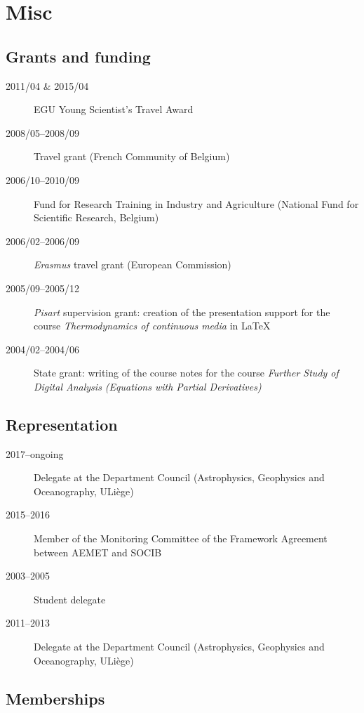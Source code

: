 \documentclass[11pt,a4paper,svgnames]{article}
\begin{document}
\section{Misc}

\subsection{Grants and funding}

\begin{description}
\item[2011/04 \& 2015/04] EGU Young Scientist's Travel Award
\item[2008/05--2008/09] Travel grant (French Community of Belgium)
\item[2006/10--2010/09] Fund for Research Training in Industry and Agriculture (National Fund for Scientific Research, Belgium)
\item[2006/02--2006/09] \textit{Erasmus} travel grant (European Commission)
\item[2005/09--2005/12] \textit{Pisart} supervision grant: creation of the presentation support for the course \textit{Thermodynamics of continuous media} in LaTeX%
\item[2004/02--2004/06] State grant: writing of the course notes for the course \textit{Further Study of Digital Analysis (Equations with Partial Derivatives)}%
\end{description}

\subsection{Representation}
\begin{description}
\item[2017--ongoing] Delegate at the Department Council (Astrophysics, Geophysics and Oceanography, ULi\`{e}ge)
\item[2015--2016] Member of the Monitoring Committee of the Framework Agreement between AEMET and SOCIB
\item[2003--2005] Student delegate 
\item[2011--2013] Delegate at the Department Council (Astrophysics, Geophysics and Oceanography, ULi\`{e}ge)
\end{description}


\subsection{Memberships}
\end{document}
